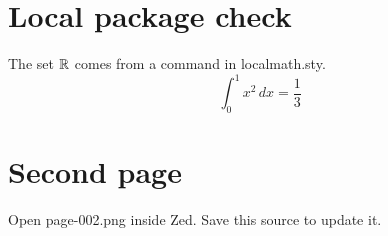 \documentclass{article}
\begin{document}
\section{Local package check}
The set $\mathbb{R}$ comes from a command in localmath.sty.
\[
  \int_0^1 x^2\,dx = \frac{1}{3}
\]
\newpage
\section{Second page}
Open page-002.png inside Zed. Save this source to update it.
\end{document}
